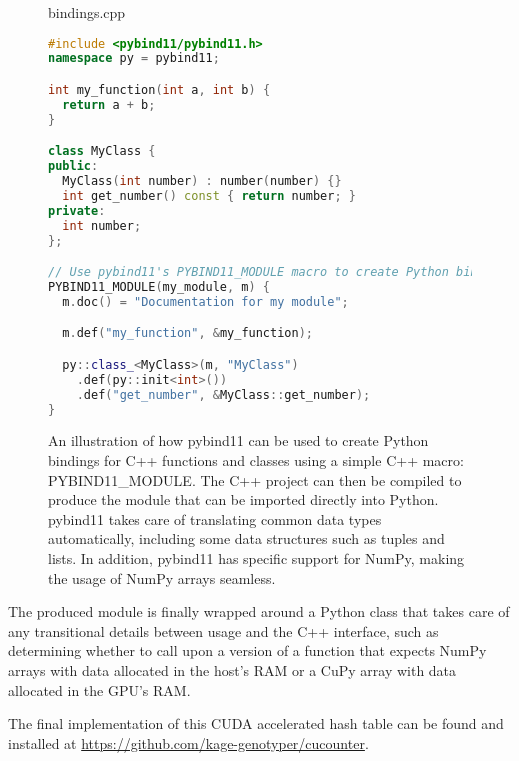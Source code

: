 \begin{figure}[ht!]
\begin{center}
bindings.cpp
\end{center}
\begin{lstlisting}[language=C++,style=cppcode]
#include <pybind11/pybind11.h>
namespace py = pybind11;

int my_function(int a, int b) {
  return a + b;
}

class MyClass {
public:
  MyClass(int number) : number(number) {}
  int get_number() const { return number; } 
private:
  int number;
};

// Use pybind11's PYBIND11_MODULE macro to create Python bindings for our simple function and class
PYBIND11_MODULE(my_module, m) {
  m.doc() = "Documentation for my module";

  m.def("my_function", &my_function);

  py::class_<MyClass>(m, "MyClass")
    .def(py::init<int>())
    .def("get_number", &MyClass::get_number);
}
\end{lstlisting}
\caption{
  An illustration of how pybind11 can be used to create Python bindings for C++ functions and classes using a simple C++ macro: PYBIND11\_MODULE.
  The C++ project can then be compiled to produce the module that can be imported directly into Python.
  pybind11 takes care of translating common data types automatically, including some data structures such as tuples and lists.
  In addition, pybind11 has specific support for NumPy, making the usage of NumPy arrays seamless.
}
\label{methods:gpu_accelerating_kmer_counting:figures:pybind11_example}
\end{figure}

The produced module is finally wrapped around a Python class that takes care of any transitional details between usage and the C++ interface, such as determining whether to call upon a version of a function that expects NumPy arrays with data allocated in the host's RAM or a CuPy array with data allocated in the GPU's RAM.

The final implementation of this CUDA accelerated hash table can be found and installed at \url{https://github.com/kage-genotyper/cucounter}.

\newpage
~\newpage

